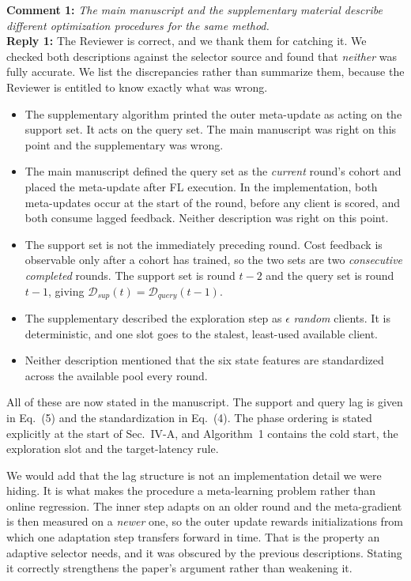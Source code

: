 \documentclass[10pt]{article}
\begin{document}
\vspace{0.5em}
\noindent
\textbf{Comment 1:} \textit{The main manuscript and the supplementary material describe different optimization procedures for the same method.}\\
\noindent
\textbf{Reply 1:} The Reviewer is correct, and we thank them for catching it. We checked both descriptions against the selector source and found that \emph{neither} was fully accurate. We list the discrepancies rather than summarize them, because the Reviewer is entitled to know exactly what was wrong.

\begin{itemize}[leftmargin=1.6em,itemsep=0.2em]
\item The supplementary algorithm printed the outer meta-update as acting on the support set. It acts on the query set. The main manuscript was right on this point and the supplementary was wrong.
\item The main manuscript defined the query set as the \emph{current} round's cohort and placed the meta-update after FL execution. In the implementation, both meta-updates occur at the start of the round, before any client is scored, and both consume lagged feedback. Neither description was right on this point.
\item The support set is not the immediately preceding round. Cost feedback is observable only after a cohort has trained, so the two sets are two \emph{consecutive completed} rounds. The support set is round $t-2$ and the query set is round $t-1$, giving $\mathcal{D}_{sup}(t)=\mathcal{D}_{query}(t-1)$.
\item The supplementary described the exploration step as $\epsilon$ \emph{random} clients. It is deterministic, and one slot goes to the stalest, least-used available client.
\item Neither description mentioned that the six state features are standardized across the available pool every round.
\end{itemize}

All of these are now stated in the manuscript. The support and query lag is given in Eq.~(5) and the standardization in Eq.~(4). The phase ordering is stated explicitly at the start of Sec.~IV-A, and Algorithm~1 contains the cold start, the exploration slot and the target-latency rule.

We would add that the lag structure is not an implementation detail we were hiding. It is what makes the procedure a meta-learning problem rather than online regression. The inner step adapts on an older round and the meta-gradient is then measured on a \emph{newer} one, so the outer update rewards initializations from which one adaptation step transfers forward in time. That is the property an adaptive selector needs, and it was obscured by the previous descriptions. Stating it correctly strengthens the paper's argument rather than weakening it.
\end{document}
